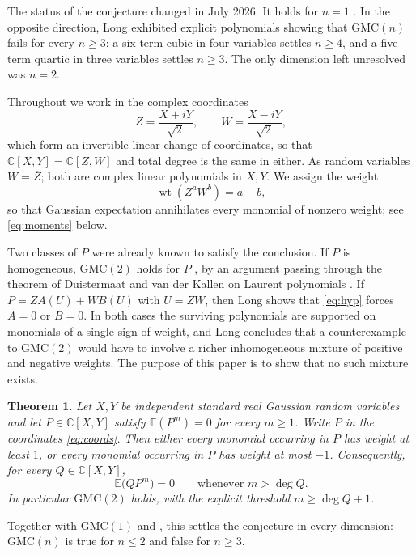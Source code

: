 \documentclass[11pt]{amsart}
\theoremstyle{plain}
\newtheorem{theorem}{Theorem}
\theoremstyle{remark}
\numberwithin{equation}{section}
\DeclareMathOperator{\wt}{wt}
\newcommand{\C}{\mathbb{C}}
\newcommand{\E}{\mathbb{E}}
\newcommand{\GMC}{\mathrm{GMC}}
\begin{document}
The status of the conjecture changed in July 2026. It holds for $n=1$
\cite[Prop.~4.2]{DvdEZ}. In the opposite direction, Long \cite{Long} exhibited
explicit polynomials showing that $\GMC(n)$ fails for every $n\ge3$: a six-term
cubic in four variables settles $n\ge4$, and a five-term quartic in three
variables settles $n\ge3$. The only dimension left unresolved was $n=2$.

Throughout we work in the complex coordinates
\begin{equation}\label{eq:coords}
  Z=\frac{X+iY}{\sqrt2},\qquad W=\frac{X-iY}{\sqrt2},
\end{equation}
which form an invertible linear change of coordinates, so that
$\C[X,Y]=\C[Z,W]$ and total degree is the same in either. As random variables
$W=\overline{Z}$; both are complex linear polynomials in $X,Y$. We assign the
weight
\[
  \wt(Z^aW^b)=a-b,
\]
so that Gaussian expectation annihilates every monomial of nonzero weight; see
\eqref{eq:moments} below.

Two classes of $P$ were already known to satisfy the conclusion. If $P$ is
homogeneous, $\GMC(2)$ holds for $P$ \cite[Cor.~4.4]{DvdEZ}, by an argument
passing through the theorem of Duistermaat and van der Kallen on Laurent
polynomials \cite{DvdK}. If $P=ZA(U)+WB(U)$ with $U=ZW$, then Long
\cite[\S7]{Long} shows that \eqref{eq:hyp} forces $A=0$ or $B=0$. In both cases
the surviving polynomials are supported on monomials of a single sign of weight,
and Long concludes that a counterexample to $\GMC(2)$ would have to involve a
richer inhomogeneous mixture of positive and negative weights. The purpose of
this paper is to show that no such mixture exists.

\begin{theorem}\label{thm:main}
Let $X,Y$ be independent standard real Gaussian random variables and let
$P\in\C[X,Y]$ satisfy $\E(P^m)=0$ for every $m\ge1$. Write $P$ in the
coordinates \eqref{eq:coords}. Then either every monomial occurring in $P$ has
weight at least $1$, or every monomial occurring in $P$ has weight at most
$-1$. Consequently, for every $Q\in\C[X,Y]$,
\[
  \E\bigl(QP^m\bigr)=0 \qquad\text{whenever } m>\deg Q .
\]
In particular $\GMC(2)$ holds, with the explicit threshold $m\ge\deg Q+1$.
\end{theorem}

Together with $\GMC(1)$ \cite[Prop.~4.2]{DvdEZ} and \cite{Long}, this settles
the conjecture in every dimension: $\GMC(n)$ is true for $n\le2$ and false for
$n\ge3$.
\end{document}
